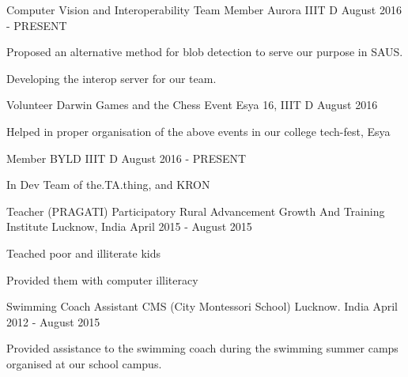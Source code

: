 \begin{cventries}
  \cventry
    {Computer Vision and Interoperability Team Member}
    {Aurora}
    {IIIT D}
    {August 2016 - PRESENT}
    {
      \begin{cvitems}
        \item {Proposed an alternative method for blob detection to serve our purpose in SAUS.}
        \item {Developing the interop server for our team.}
      \end{cvitems}
    }
    \cventry
    {Volunteer}
    {Darwin Games and the Chess Event}
    {Esya 16, IIIT D}
    {August 2016}
    {
        \begin{cvitems}
            \item{Helped in proper organisation of the above events in our college tech-fest, Esya}
        \end{cvitems}
    }
  \cventry
    {Member}
    {BYLD}
    {IIIT D}
    {August 2016 - PRESENT}
    {
        \begin{cvitems}
            \item{In Dev Team of the.TA.thing, and KRON }
        \end{cvitems}
    }
  \cventry
    {Teacher}
    {(PRAGATI) Participatory Rural Advancement Growth And Training Institute}
    {Lucknow, India}
    {April 2015 - August 2015}
    {
      \begin{cvitems}
        \item {Teached poor and illiterate kids}
        \item {Provided them with computer illiteracy}
      \end{cvitems}
    }
    \cventry
    {Swimming Coach Assistant}
    {CMS (City Montessori School)}
    {Lucknow. India}
    {April 2012 - August 2015}
    {
      \begin{cvitems}
        \item {Provided assistance to the swimming coach during the swimming summer camps organised at our school campus. }
      \end{cvitems}
    }
\end{cventries}
